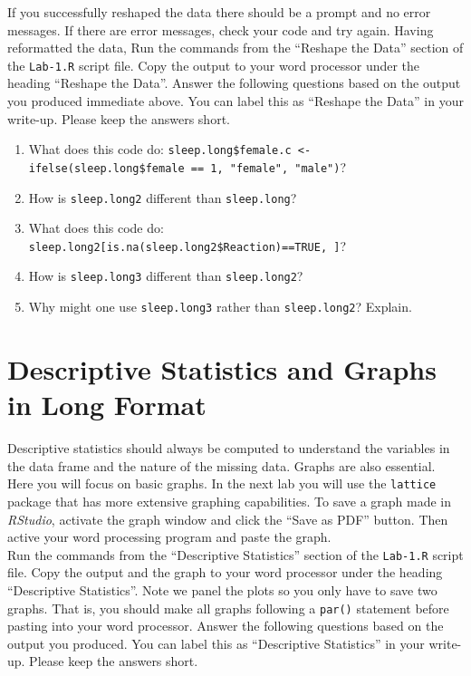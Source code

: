 \documentclass[]{article}
\begin{document}
\noindent If you successfully reshaped the data there should be a prompt and no error messages. If there are error messages, check your code and try again. Having reformatted the data, Run the commands from the ``Reshape the Data'' section of the \texttt{Lab-1.R} script file. Copy the output to your word processor under the heading ``Reshape the Data''. Answer the following questions based on the output you produced immediate above. You can label this as ``Reshape the Data'' in your write-up. Please keep the answers short.

\begin{enumerate}[resume]
\item What does this code do: \texttt{sleep.long\$female.c <- ifelse(sleep.long\$female == 1, "female", "male")}?
\item How is \texttt{sleep.long2} different than \texttt{sleep.long}?
\item What does this code do: \verb,sleep.long2[is.na(sleep.long2$Reaction)==TRUE,\texttt{, ]}?
\item How is \texttt{sleep.long3} different than \texttt{sleep.long2}?
\item Why might one use \texttt{sleep.long3} rather than \texttt{sleep.long2}? Explain.
\end{enumerate}
\pagebreak

%
%

\section*{Descriptive Statistics and Graphs in Long Format}

\noindent Descriptive statistics should always be computed to understand the variables in the data frame and the nature of the missing data. Graphs are also essential. Here you will focus on basic graphs. In the next lab you will use the \texttt{lattice} package that has more extensive graphing capabilities. To save a graph made in \textit{RStudio}, activate the graph window and click the ``Save as PDF'' button. Then active your word processing program and paste the graph. \\
\linebreak
Run the commands from the ``Descriptive Statistics'' section of the \texttt{Lab-1.R} script file. Copy the output and the graph to your word processor under the heading ``Descriptive Statistics''. Note we panel the plots so you only have to save two graphs. That is, you should make all graphs following a \texttt{par()} statement before pasting into your word processor. Answer the following questions based on the output you produced. You can label this as ``Descriptive Statistics'' in your write-up. Please keep the answers short.
\end{document}
